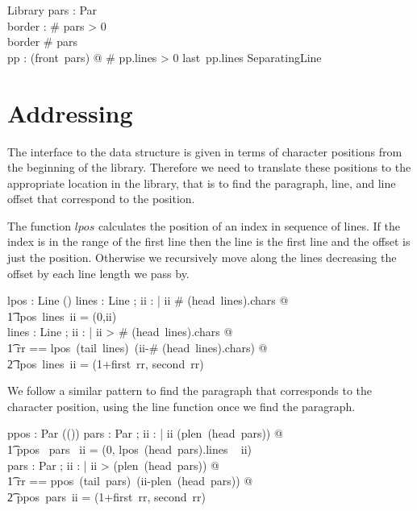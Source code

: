 \documentclass{article}
\begin{document}
\begin{schema}{Library}
	pars : \seq Par \\
	border : \nat
\where
	\# pars > 0 \\
	border \leq \# pars \\
	\forall pp : \ran (front~pars) @ \# pp.lines > 0 \land last~pp.lines \in SeparatingLine 
\end{schema}

\section{Addressing}

The interface to the data structure is given in terms of character positions from the beginning of the library. Therefore we need to translate these positions to the appropriate location in the library, that is to find the paragraph, line, and line offset that correspond to the position. 

The function $lpos$ calculates the position of an index in sequence of lines. If the index is in the range of the first line then the line is the first line and the offset is just the position. Otherwise we recursively move along the lines decreasing the offset by each line length we pass by.

\begin{axdef}
	lpos : \seq Line \pfun \nat \fun (\nat \cross \nat)
\where
	\forall lines : \seq Line ; ii : \nat | ii \leq \# (head~lines).chars @ \\
	\t1 lpos~lines~ii = (0,ii) \\
	\forall lines : \seq Line ; ii : \nat | ii > \# (head~lines).chars @ \\
	\t1 \LET rr == lpos~(tail~lines)~(ii-\# (head~lines).chars) @ \\
	\t2   lpos~lines~ii = (1+first~rr, second~rr)
\end{axdef}

We follow a similar pattern to find the paragraph that corresponds to the character position, using the line function once we find the paragraph.

\begin{axdef}
	ppos : \seq Par \pfun \nat \fun (\nat \cross (\nat \cross \nat))
\where
	\forall pars : \seq Par ; ii : \nat | ii \leq (plen~(head~pars)) @ \\
	\t1 ppos ~pars ~ii = (0, lpos~(head~pars).lines ~ ii) \\
	\forall pars : \seq Par ; ii : \nat | ii > (plen~(head~pars)) @ \\
	\t1 \LET rr == ppos~(tail~pars)~(ii-plen~(head~pars)) @ \\
	\t2    ppos~pars~ii = (1+first~rr, second~rr)
\end{axdef}
\end{document}
